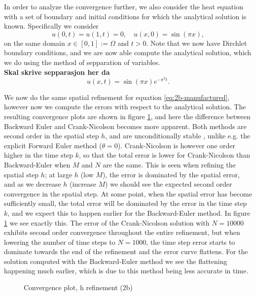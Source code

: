 In order to analyze the convergence further, 
we also consider the heat equation with a set of boundary and initial conditions for which the analytical solution is known. 
Specifically we consider 
\begin{equation}
    u(0,t) = u(1,t) = 0, \quad u(x,0) = \sin(\pi x), 
    \label{eq:2b-manufactured}
\end{equation}
on the same domain $x \in [0,1] := \Omega$ and $t > 0$. 
Note that we now have Dirchlet boundary conditions, 
and we are now able compute the analytical solution, 
which we do using the method of sepparation of variables. 
\\ \textbf{Skal skrive sepparasjon her da}
\begin{equation}
    u(x,t) = \sin(\pi x)  e^{- \pi^2 t}.
\end{equation}

We now do the same spatial refinement for equation \eqref{eq:2b-manufactured}, 
however now we compute the errors with respect to the analytical solution. 
The resulting convergence plots are shown in figure \ref{fig:2b-spatial-ref}, 
and here the difference between Backward Euler and Crank-Nicolson becomes more apparent. 
Both methods are second order in the spatial step $h$, 
and are unconditionally stable \cite{find some source probably brynjulf}, 
unlike e.g. the explicit Forward Euler method ($\theta=0$). 
Crank-Nicolson is however one order higher in the time step $k$, 
so that the total error is lower for Crank-Nicolson than Backward-Euler when $M$ and $N$ are the same. 
This is seen when refining the spatial step $h$; 
at large $h$ (low $M$), 
the error is dominated by the spatial error, 
and as we decrease $h$ (increase $M$) we should see the expected second order convergence in the spatial step. 
At some point, 
when the spatial error has become sufficiently small, 
the total error will be dominated by the error in the time step $k$, 
and we expect this to happen earlier for the Backward-Euler method. 
In figure \ref{fig:2b-spatial-ref} we see exactly this. 
The error of the Crank-Nicolson solution with $N=10000$ exhibits second order convergence throughout the entire refinement, 
but when lowering the number of time steps to $N=1000$, 
the time step error starts to dominate towards the end of the refinement and the error curve flattens. 
For the solution computed with the Backward-Euler method we see the flattening happening much earlier, 
which is due to this method being less accurate in time. 
\begin{figure}[ht]
    \centering
    
    \caption{Convergence plot, h refinement (2b)}
    \label{fig:2b-spatial-ref}
\end{figure}

